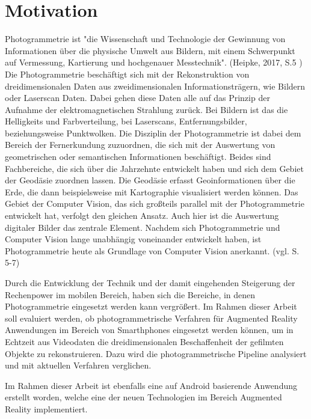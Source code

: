 \chapter{Motivation}

Photogrammetrie ist "die Wissenschaft und Technologie der Gewinnung von Informationen
über die physische Umwelt aus Bildern, mit einem Schwerpunkt auf Vermessung,
Kartierung und hochgenauer Messtechnik". (Heipke, 2017, S.5 \cite{photo})  Die Photogrammetrie beschäftigt sich  mit der Rekonstruktion von dreidimensionalen Daten aus zweidimensionalen Informationsträgern, wie Bildern oder Laserscan Daten. Dabei gehen diese Daten alle auf das Prinzip der Aufnahme der elektromagnetischen Strahlung zurück. Bei Bildern ist das die Helligkeits und Farbverteilung, bei Laserscans, Entfernungsbilder, beziehungsweise Punktwolken. Die Disziplin der Photogrammetrie ist dabei dem Bereich der Fernerkundung zuzuordnen, die sich mit der Auswertung von geometrischen oder semantischen Informationen beschäftigt. Beides sind Fachbereiche, die sich über die Jahrzehnte entwickelt haben und sich dem Gebiet der Geodäsie zuordnen lassen. Die Geodäsie erfasst Geoinformationen über die Erde, die dann beispielsweise mit Kartographie visualisiert werden können. Das Gebiet der Computer Vision, das sich großteils parallel mit der Photogrammetrie entwickelt hat, verfolgt den gleichen Ansatz. Auch hier ist die Auswertung digitaler Bilder das zentrale Element. Nachdem sich Photogrammetrie und Computer Vision lange unabhängig voneinander entwickelt haben, ist Photogrammetrie heute als Grundlage von Computer Vision anerkannt. (vgl. \cite{photo} S. 5-7)

Durch die Entwicklung der Technik und der damit eingehenden Steigerung der Rechenpower im mobilen Bereich, haben sich die Bereiche, in denen Photogrammetrie eingesetzt werden kann vergrößert. Im Rahmen dieser Arbeit soll evaluiert werden, ob photogrammetrische Verfahren für Augmented Reality Anwendungen im Bereich von Smarthphones eingesetzt werden können, um in Echtzeit aus Videodaten die dreidimensionalen Beschaffenheit der gefilmten Objekte zu rekonstruieren. Dazu wird die photogrammetrische Pipeline analysiert und mit aktuellen Verfahren verglichen.

Im Rahmen dieser Arbeit ist ebenfalls eine auf Android basierende Anwendung erstellt worden, welche eine der neuen Technologien im Bereich Augmented Reality implementiert.



  


